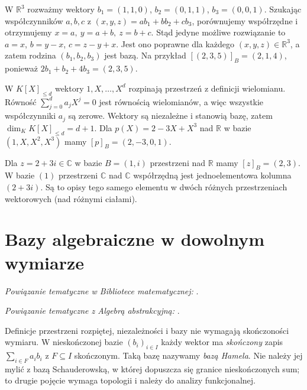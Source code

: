 \begin{przyklad}
\label{prz:lin-wspolrzedne-niekanoniczne}
W \(\mathbb R^3\) rozważmy wektory
\(b_1=(1,1,0)\), \(b_2=(0,1,1)\),
\(b_3=(0,0,1)\).
Szukając współczynników \(a,b,c\) z
\((x,y,z)=ab_1+bb_2+cb_3\),
porównujemy współrzędne i otrzymujemy
\(x=a,\ y=a+b,\ z=b+c\).
Stąd jedyne możliwe rozwiązanie to
\(a=x\), \(b=y-x\), \(c=z-y+x\).
Jest ono poprawne dla każdego \((x,y,z)\in\mathbb R^3\),
a zatem rodzina \((b_1,b_2,b_3)\) jest bazą.
Na przykład
\([(2,3,5)]_B=(2,1,4)\), ponieważ
\(2b_1+b_2+4b_3=(2,3,5)\).
\end{przyklad}

\begin{przyklad}
\label{prz:lin-baza-wielomianow}
W \(K[X]_{\leq d}\) wektory \(1,X,\ldots,X^d\)
rozpinają przestrzeń z definicji wielomianu.
Równość \(\sum_{j=0}^d a_jX^j=0\)
jest równością wielomianów, a więc wszystkie
współczynniki \(a_j\) są zerowe.
Wektory są niezależne i stanowią bazę,
zatem \(\dim_KK[X]_{\leq d}=d+1\).
Dla \(p(X)=2-3X+X^3\) nad \(\mathbb R\)
w bazie \((1,X,X^2,X^3)\) mamy
\([p]_B=(2,-3,0,1)\).
\end{przyklad}

\begin{przyklad}
\label{prz:lin-wspolrzedne-ciala}
Dla \(z=2+3i\in\mathbb C\)
w bazie \(B=(1,i)\) przestrzeni nad
\(\mathbb R\) mamy \([z]_B=(2,3)\).
W bazie \((1)\) przestrzeni \(\mathbb C\)
nad \(\mathbb C\) współrzędną jest jednoelementowa
kolumna \((2+3i)\).
Są to opisy tego samego elementu w dwóch różnych
przestrzeniach wektorowych (nad różnymi ciałami).
\end{przyklad}

\section{Bazy algebraiczne w dowolnym wymiarze}
\label{sec:lin-bazy-nieskonczone}

\noindent\emph{Powiązanie tematyczne w Bibliotece matematycznej:} .


\noindent\emph{Powiązanie tematyczne z Algebrą abstrakcyjną:} .


Definicje przestrzeni rozpiętej, niezależności i bazy
nie wymagają skończoności wymiaru.
W nieskończonej bazie \((b_i)_{i\in I}\)
każdy wektor ma \emph{skończony} zapis
\(\sum_{i\in F}a_ib_i\) z \(F\subseteq I\) skończonym.
Taką bazę nazywamy \emph{bazą Hamela}.
Nie należy jej mylić z bazą Schauderowską,
w której dopuszcza się granice nieskończonych sum;
to drugie pojęcie wymaga topologii i należy do analizy funkcjonalnej.

